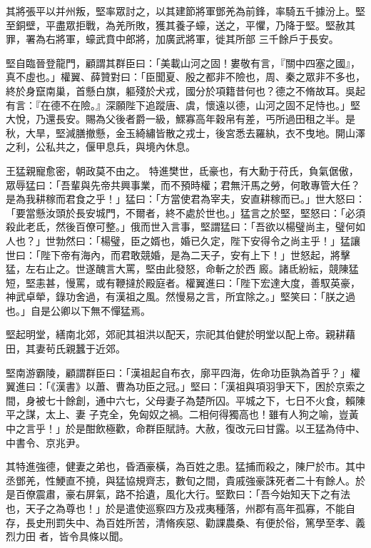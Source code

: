\begin{pinyinscope}
 其將張平以并州叛，堅率眾討之，以其建節將軍鄧羌為前鋒，率騎五千據汾上。堅至銅壁，平盡眾拒戰，為羌所敗，獲其養子蠔，送之，平懼，乃降于堅。堅赦其罪，署為右將軍，蠔武賁中郎將，加廣武將軍，徙其所部
 三千餘戶于長安。



 堅自臨晉登龍門，顧謂其群臣曰：「美載山河之固！婁敬有言，『關中四塞之國』，真不虛也。」權翼、薛贊對曰：「臣聞夏、殷之都非不險也，周、秦之眾非不多也，終於身竄南巢，首懸白旗，軀殘於犬戎，國分於項籍昔何也？德之不脩故耳。吳起有言：『在德不在險。』深願陛下追蹤唐、虞，懷遠以德，山河之固不足恃也。」堅大悅，乃還長安。賜為父後者爵一級，鰥寡高年穀帛有差，丐所過田租之半。是秋，大旱，堅減膳撤懸，金玉綺繡皆散之戎士，後宮悉去羅紈，衣不曳地。開山澤之利，公私共之，偃甲息兵，與境內休息。



 王猛親寵愈密，朝政莫不由之。
 特進樊世，氐豪也，有大勳于苻氏，負氣倨傲，眾辱猛曰：「吾輩與先帝共興事業，而不預時權；君無汗馬之勞，何敢專管大任？是為我耕稼而君食之乎！」猛曰：「方當使君為宰夫，安直耕稼而已。」世大怒曰：「要當懸汝頭於長安城門，不爾者，終不處於世也。」猛言之於堅，堅怒曰：「必須殺此老氐，然後百僚可整。」俄而世入言事，堅謂猛曰：「吾欲以楊璧尚主，璧何如人也？」世勃然曰：「楊璧，臣之婿也，婚已久定，陛下安得令之尚主乎！」猛讓世曰：「陛下帝有海內，而君敢競婚，是為二天子，安有上下！」世怒起，將擊猛，左右止之。世遂醜言大罵，堅由此發怒，命斬之於西
 廄。諸氐紛紜，競陳猛短，堅恚甚，慢罵，或有鞭撻於殿庭者。權翼進曰：「陛下宏達大度，善馭英豪，神武卓犖，錄功舍過，有漢祖之風。然慢易之言，所宜除之。」堅笑曰：「朕之過也。」自是公卿以下無不憚猛焉。



 堅起明堂，繕南北郊，郊祀其祖洪以配天，宗祀其伯健於明堂以配上帝。親耕藉田，其妻茍氏親蠶于近郊。



 堅南游霸陵，顧謂群臣曰：「漢祖起自布衣，廓平四海，佐命功臣孰為首乎？」權翼進曰：「《漢書》以蕭、曹為功臣之冠。」堅曰：「漢祖與項羽爭天下，困於京索之間，身被七十餘創，通中六七，父母妻子為楚所囚。平城之下，七日不火食，賴陳平之謀，太上、妻
 子克全，免匈奴之禍。二相何得獨高也！雖有人狗之喻，豈黃中之言乎！」於是酣飲極歡，命群臣賦詩。大赦，復改元曰甘露。以王猛為侍中、中書令、京兆尹。



 其特進強德，健妻之弟也，昏酒豪橫，為百姓之患。猛捕而殺之，陳尸於市。其中丞鄧羌，性鯁直不撓，與猛協規齊志，數旬之間，貴戚強豪誅死者二十有餘人。於是百僚震肅，豪右屏氣，路不拾遺，風化大行。堅歎曰：「吾今始知天下之有法也，天子之為尊也！」於是遣使巡察四方及戎夷種落，州郡有高年孤寡，不能自存，長史刑罰失中、為百姓所苦，清脩疾惡、勸課農桑、有便於俗，篤學至孝、義烈力田
 者，皆令具條以聞。




\end{pinyinscope}
